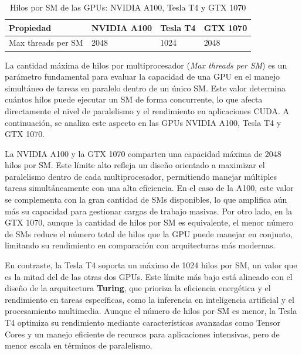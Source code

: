 \documentclass{article}
\begin{document}
			\begin{table}[H]
				\begin{adjustbox}{width=\textwidth, keepaspectratio}
					\begin{tabular}{|l|l|l|l|}
						\hline
						\textbf{Propiedad} & \textbf{NVIDIA A100} & \textbf{Tesla T4} & \textbf{GTX 1070} \\ \hline
						Max threads per SM & 2048 & 1024 & 2048 \\ \hline
					\end{tabular}
				\end{adjustbox}
				\centering
				\caption{Hilos por SM de las GPUs: NVIDIA A100, Tesla T4 y GTX 1070}
			\end{table}

			La cantidad máxima de hilos por multiprocesador (\textit{Max threads per SM}) es un parámetro fundamental para evaluar la capacidad de una GPU en el manejo simultáneo de tareas en paralelo dentro de un único SM. Este valor determina cuántos hilos puede ejecutar un SM de forma concurrente, lo que afecta directamente el nivel de paralelismo y el rendimiento en aplicaciones CUDA. A continuación, se analiza este aspecto en las GPUs NVIDIA A100, Tesla T4 y GTX 1070.

			La NVIDIA A100 y la GTX 1070 comparten una capacidad máxima de 2048 hilos por SM. Este límite alto refleja un diseño orientado a maximizar el paralelismo dentro de cada multiprocesador, permitiendo manejar múltiples tareas simultáneamente con una alta eficiencia. En el caso de la A100, este valor se complementa con la gran cantidad de SMs disponibles, lo que amplifica aún más su capacidad para gestionar cargas de trabajo masivas. Por otro lado, en la GTX 1070, aunque la cantidad de hilos por SM es equivalente, el menor número de SMs reduce el número total de hilos que la GPU puede manejar en conjunto, limitando su rendimiento en comparación con arquitecturas más modernas.

			En contraste, la Tesla T4 soporta un máximo de 1024 hilos por SM, un valor que es la mitad del de las otras dos GPUs. Este límite más bajo está alineado con el diseño de la arquitectura \textbf{Turing}, que prioriza la eficiencia energética y el rendimiento en tareas específicas, como la inferencia en inteligencia artificial y el procesamiento multimedia. Aunque el número de hilos por SM es menor, la Tesla T4 optimiza su rendimiento mediante características avanzadas como Tensor Cores y un manejo eficiente de recursos para aplicaciones intensivas, pero de menor escala en términos de paralelismo.
\end{document}
